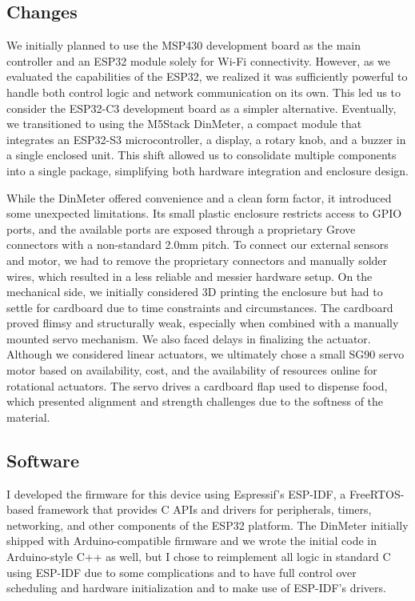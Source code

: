 \documentclass[12pt]{article}
\begin{document}
\subsection{Changes}
We initially planned to use the MSP430 development board as the main controller and an ESP32 module solely for Wi-Fi connectivity. However, as we evaluated the capabilities of the ESP32, we realized it was sufficiently powerful to handle both control logic and network communication on its own. This led us to consider the ESP32-C3 development board as a simpler alternative. Eventually, we transitioned to using the M5Stack DinMeter, a compact module that integrates an ESP32-S3 microcontroller, a display, a rotary knob, and a buzzer in a single enclosed unit. This shift allowed us to consolidate multiple components into a single package, simplifying both hardware integration and enclosure design.

While the DinMeter offered convenience and a clean form factor, it introduced some unexpected limitations. Its small plastic enclosure restricts access to GPIO ports, and the available ports are exposed through a proprietary Grove connectors with a non-standard 2.0mm pitch. To connect our external sensors and motor, we had to remove the proprietary connectors and manually solder wires, which resulted in a less reliable and messier hardware setup. On the mechanical side, we initially considered 3D printing the enclosure but had to settle for cardboard due to time constraints and circumstances. The cardboard proved flimsy and structurally weak, especially when combined with a manually mounted servo mechanism. We also faced delays in finalizing the actuator. Although we considered linear actuators, we ultimately chose a small SG90 servo motor based on availability, cost, and the availability of resources online for rotational actuators. The servo drives a cardboard flap used to dispense food, which presented alignment and strength challenges due to the softness of the material.
\subsection{Software}
I developed the firmware for this device using Espressif's ESP-IDF, a FreeRTOS-based framework that provides C APIs and drivers for peripherals, timers, networking, and other components of the ESP32 platform. The DinMeter initially shipped with Arduino-compatible firmware and we wrote the initial code in Arduino-style C++ as well, but I chose to reimplement all logic in standard C using ESP-IDF due to some complications and to have full control over scheduling and hardware initialization and to make use of ESP-IDF's drivers.
\end{document}
